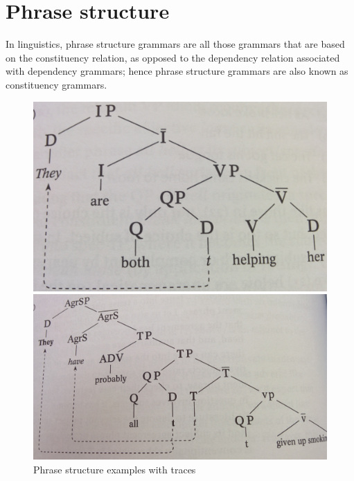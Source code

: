 \documentclass[11pt,a4paper,titlepage]{article}
\begin{document}
\section{Phrase structure}
\label{sec:ps}
In linguistics, phrase structure grammars are all those grammars that are based on the constituency relation, as opposed to the dependency relation associated with dependency grammars; hence phrase structure grammars are also known as constituency grammars.
\begin{figure}[H]
\centering
	\begin{minipage}{.45\textwidth}
		\centering
		\includegraphics[width=\linewidth]{pics/tree1.jpg}
	\end{minipage}
	\begin{minipage}{.45\textwidth}
		\centering
		\includegraphics[width=\linewidth]{pics/tree2.jpg}
	\end{minipage}
	\caption{Phrase structure examples with traces}
\end{figure}
\end{document}
